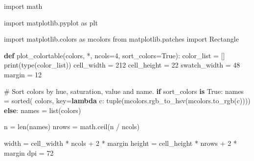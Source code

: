 \documentclass[
  letterpaper,
  DIV=11,
  numbers=noendperiod]{scrartcl}
\newenvironment{Shaded}{\begin{snugshade}}{\end{snugshade}}
\newcommand{\BuiltInTok}[1]{\textcolor[rgb]{0.00,0.23,0.31}{#1}}
\newcommand{\CommentTok}[1]{\textcolor[rgb]{0.37,0.37,0.37}{#1}}
\newcommand{\ControlFlowTok}[1]{\textcolor[rgb]{0.00,0.23,0.31}{\textbf{#1}}}
\newcommand{\DecValTok}[1]{\textcolor[rgb]{0.68,0.00,0.00}{#1}}
\newcommand{\ImportTok}[1]{\textcolor[rgb]{0.00,0.46,0.62}{#1}}
\newcommand{\KeywordTok}[1]{\textcolor[rgb]{0.00,0.23,0.31}{\textbf{#1}}}
\newcommand{\NormalTok}[1]{\textcolor[rgb]{0.00,0.23,0.31}{#1}}
\newcommand{\OperatorTok}[1]{\textcolor[rgb]{0.37,0.37,0.37}{#1}}
\newcommand{\VariableTok}[1]{\textcolor[rgb]{0.07,0.07,0.07}{#1}}
\begin{document}
\begin{Shaded}
\begin{Highlighting}[]
\ImportTok{import}\NormalTok{ math}

\ImportTok{import}\NormalTok{ matplotlib.pyplot }\ImportTok{as}\NormalTok{ plt}

\ImportTok{import}\NormalTok{ matplotlib.colors }\ImportTok{as}\NormalTok{ mcolors}
\ImportTok{from}\NormalTok{ matplotlib.patches }\ImportTok{import}\NormalTok{ Rectangle}


\KeywordTok{def}\NormalTok{ plot\_colortable(colors, }\OperatorTok{*}\NormalTok{, ncols}\OperatorTok{=}\DecValTok{4}\NormalTok{, sort\_colors}\OperatorTok{=}\VariableTok{True}\NormalTok{):}
\NormalTok{    color\_list }\OperatorTok{=}\NormalTok{ []}
    \BuiltInTok{print}\NormalTok{(}\BuiltInTok{type}\NormalTok{(color\_list))}
\NormalTok{    cell\_width }\OperatorTok{=} \DecValTok{212}
\NormalTok{    cell\_height }\OperatorTok{=} \DecValTok{22}
\NormalTok{    swatch\_width }\OperatorTok{=} \DecValTok{48}
\NormalTok{    margin }\OperatorTok{=} \DecValTok{12}

    \CommentTok{\# Sort colors by hue, saturation, value and name.}
    \ControlFlowTok{if}\NormalTok{ sort\_colors }\KeywordTok{is} \VariableTok{True}\NormalTok{:}
\NormalTok{        names }\OperatorTok{=} \BuiltInTok{sorted}\NormalTok{(}
\NormalTok{            colors, key}\OperatorTok{=}\KeywordTok{lambda}\NormalTok{ c: }\BuiltInTok{tuple}\NormalTok{(mcolors.rgb\_to\_hsv(mcolors.to\_rgb(c))))}
    \ControlFlowTok{else}\NormalTok{:}
\NormalTok{        names }\OperatorTok{=} \BuiltInTok{list}\NormalTok{(colors)}

\NormalTok{    n }\OperatorTok{=} \BuiltInTok{len}\NormalTok{(names)}
\NormalTok{    nrows }\OperatorTok{=}\NormalTok{ math.ceil(n }\OperatorTok{/}\NormalTok{ ncols)}

\NormalTok{    width }\OperatorTok{=}\NormalTok{ cell\_width }\OperatorTok{*}\NormalTok{ ncols }\OperatorTok{+} \DecValTok{2} \OperatorTok{*}\NormalTok{ margin}
\NormalTok{    height }\OperatorTok{=}\NormalTok{ cell\_height }\OperatorTok{*}\NormalTok{ nrows }\OperatorTok{+} \DecValTok{2} \OperatorTok{*}\NormalTok{ margin}
\NormalTok{    dpi }\OperatorTok{=} \DecValTok{72}


\end{Highlighting}
\end{Shaded}
\end{document}
